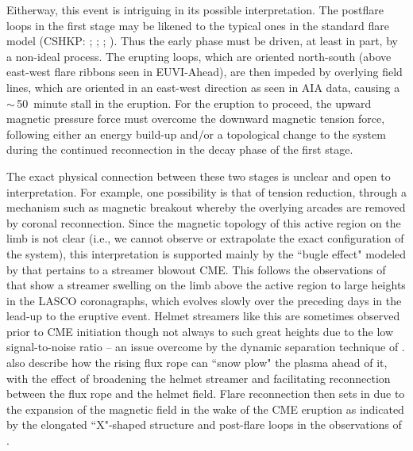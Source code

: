 \documentclass[namedreferences]{solarphysics}
\begin{document}
\begin{article}
{%

Eitherway, this event is intriguing in its possible interpretation. The postflare loops in the first stage may be likened to the typical ones in the standard flare model (CSHKP: ; ; ; ). Thus the early phase must be driven, at least in part, by a non-ideal process. The erupting loops, which are oriented north-south (above east-west flare ribbons seen in EUVI-Ahead), are then impeded by overlying field lines, which are oriented in an east-west direction as seen in AIA data, causing a $\sim$\,50~minute stall in the eruption. For the eruption to proceed, the upward magnetic pressure force must overcome the downward magnetic tension force, following either an energy build-up and/or a topological change to the system during the continued reconnection in the decay phase of the first stage.

The exact physical connection between these two stages is unclear and open to interpretation. For example, one possibility is that of tension reduction, through a mechanism such as magnetic breakout whereby the overlying arcades are removed by coronal reconnection. Since the magnetic topology of this active region on the limb is not clear (i.e., we cannot observe or extrapolate the exact configuration of the system), this interpretation is supported mainly by the ``bugle effect" modeled by  that pertains to a streamer blowout CME. This follows the observations of  that show a streamer swelling on the limb above the active region to large heights in the LASCO coronagraphs, which evolves slowly over the preceding days in the lead-up to the eruptive event. Helmet streamers like this are sometimes observed prior to CME initiation \cite{1993JGR....9813177H} though not always to such great heights due to the low signal-to-noise ratio -- an issue overcome by the dynamic separation technique of .  also describe how the rising flux rope can ``snow plow" the plasma ahead of it, with the effect of broadening the helmet streamer and facilitating reconnection between the flux rope and the helmet field. Flare reconnection then sets in due to the expansion of the magnetic field in the wake of the CME eruption as indicated by the elongated ``X"-shaped structure and post-flare loops in the observations of .

}
\end{article}
\end{document}
